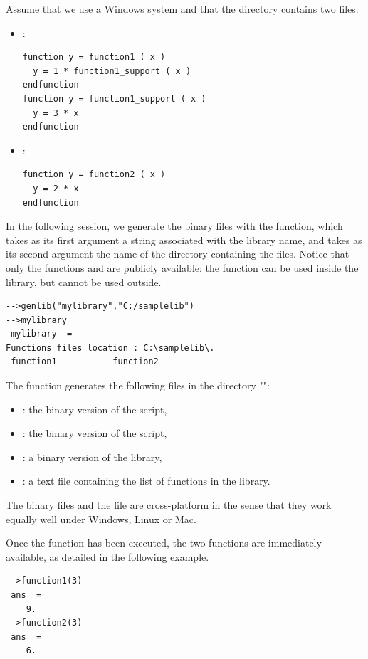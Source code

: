 Assume that we use a Windows system and that the  directory 
contains two files:
\begin{itemize}
\item {}:

\lstset{language=scilabscript}
\begin{lstlisting}
function y = function1 ( x )
  y = 1 * function1_support ( x )
endfunction
function y = function1_support ( x )
  y = 3 * x
endfunction
\end{lstlisting}
\item {}:

\lstset{language=scilabscript}
\begin{lstlisting}
function y = function2 ( x )
  y = 2 * x
endfunction
\end{lstlisting}
\end{itemize}
In the following session, we generate the binary files with the 
 function, which takes as its first 
argument a string associated with the library name, and takes 
as its second argument the name of the directory 
containing the files. Notice that only the functions 
 and  are publicly
available: the  function can 
be used inside the library, but cannot be used outside.
\lstset{language=scilabscript}
\begin{lstlisting}
-->genlib("mylibrary","C:/samplelib")
-->mylibrary
 mylibrary  =
Functions files location : C:\samplelib\.
 function1           function2           
\end{lstlisting}
The  function generates the following files in the directory "":
\begin{itemize}
\item {}: the binary version of the  script,
\item {}: the binary version of the  script,
\item {}: a binary version of the library,
\item {}: a text file containing the list of functions in the library.
\end{itemize}
The binary files  and the  file 
are cross-platform in the sense that they work equally well under Windows, Linux or Mac.

Once the  function has been executed, the 
two functions are immediately available, as detailed in the 
following example.
\lstset{language=scilabscript}
\begin{lstlisting}
-->function1(3)
 ans  =
    9.  
-->function2(3)
 ans  =
    6.  
\end{lstlisting}

